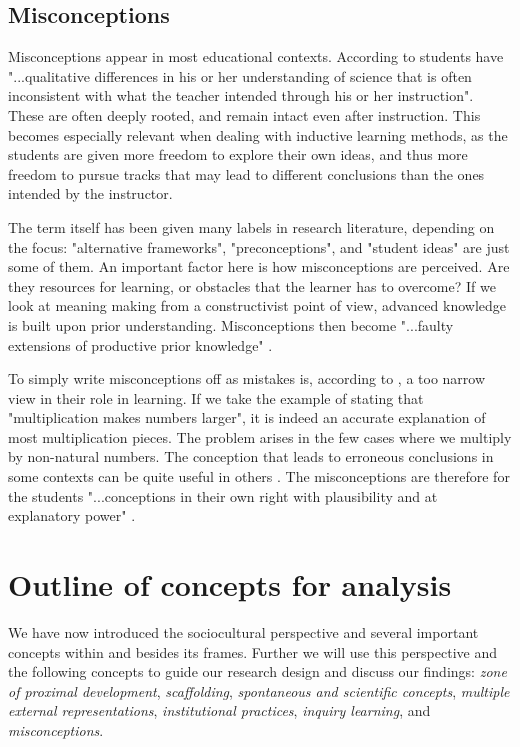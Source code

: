 \subsection{Misconceptions}
Misconceptions appear in most educational contexts. According to \citet[p. 437]{gomez2008elementary} students have "...qualitative differences in his or her understanding of science that is often inconsistent with what the teacher intended through his or her instruction". These are often deeply rooted, and remain intact even after instruction. This becomes especially relevant when dealing with inductive learning methods, as the students are given more freedom to explore their own ideas, and thus more freedom to pursue tracks that may lead to different conclusions than the ones intended by the instructor.

The term itself has been given many labels in research literature, depending on the focus: "alternative frameworks", "preconceptions", and "student ideas" are just some of them. An important factor here is how misconceptions are perceived. Are they resources for learning, or obstacles that the learner has to overcome? If we look at meaning making from a constructivist point of view, advanced knowledge is built upon prior understanding. Misconceptions then become "...faulty extensions of productive prior knowledge" \citep[p. 152]{smith1994misconceptions}.

To simply write misconceptions off as mistakes is, according to \citet{smith1994misconceptions}, a too narrow view in their role in learning. If we take the example of stating that "multiplication makes numbers larger", it is indeed an accurate explanation of most multiplication pieces. The problem arises in the few cases where we multiply by non-natural numbers. The conception that leads to erroneous conclusions in some contexts can be quite useful in others \citep{smith1994misconceptions}. The misconceptions are therefore for the students "...conceptions in their own right with plausibility and at explanatory power" \citetext{\citealp{smith1994misconceptions}, referenced in \citealp{larkin2012misconceptions}, p. 928}. 


\section{Outline of concepts for analysis}
We have now introduced the sociocultural perspective and several important concepts within and besides its frames. Further we will use this perspective and the following concepts to guide our research design and discuss our findings: \emph{zone of proximal development}, \emph{scaffolding}, \emph{spontaneous and scientific concepts}, \emph{multiple external representations}, \emph{institutional practices}, \emph{inquiry learning}, and \emph{misconceptions}.
